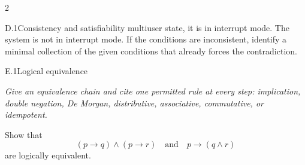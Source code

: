 \documentclass[9pt]{extarticle}
\begin{document}
\begin{multicols}{2}
\begin{CoreProblem}{D.1}{Consistency and satisfiability}
multiuser state, it is in interrupt mode. The system is not in interrupt mode.
If the conditions are inconsistent, identify a minimal collection of the given
conditions that already forces the contradiction.
\end{CoreProblem}
\begin{CoreProblem}{E.1}{Logical equivalence}
{\scriptsize\textit{Give an equivalence chain and cite one permitted rule at every step: implication, double negation, De Morgan, distributive, associative, commutative, or idempotent.}\par}
Show that
\[
  (p\to q)\land(p\to r)
  \quad\text{and}\quad
  p\to(q\land r)
\]
are logically equivalent.
\end{CoreProblem}
\end{multicols}
\CoreWorkArea
\FormBreak
{}
\end{document}

